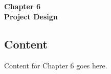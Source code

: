 
\titleformat{\chapter}[block]{\normalfont}{}{0pt}{}
\titlespacing{\chapter}{0pt}{-2em}{0pt}
\chapter[Project Design]{}
\vspace*{\fill}
\begin{center}
\textbf{\Huge{Chapter 6}}\\
\vspace{5mm}
\textbf{\Huge{Project Design}}
\end{center}
\vspace*{\fill}
\newpage

\titleformat{\chapter}[display]{\vspace{1cm}\normalfont\Large\bfseries\centering}{\chaptertitlename\ \thechapter}{20pt}{\vspace{0pt}}
\titlespacing*{\chapter}{0pt}{-50pt}{20pt}

\section{Content}
\justify

Content for Chapter 6 goes here.

